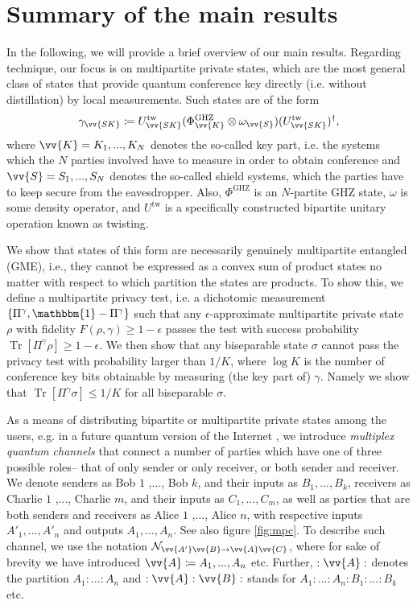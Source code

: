 \documentclass[aps,pra,twocolumn,superscriptaddress,longbibliography]{revtex4-1}
\def\Tr{\operatorname{Tr}}
\def\GHZ{\operatorname{GHZ}}
\newcommand{\mc}[1]{\mathcal{#1}}
\newcommand{\bbm}[1]{\mathbbm{#1}}
\begin{document}
\section{Summary of the main results}\label{sec:main}
In the following, we will provide a brief overview of our main results. Regarding technique, our focus is on multipartite private states, which are the most general class of states that provide quantum conference key directly (i.e. without distillation) by local measurements. Such states are of the form  \cite{AH09}
\begin{equation}
\gamma_{\vv{SK}}\coloneqq U^{\text{tw}}_{\vv{SK}} (\Phi^{\GHZ}_{\vv{K}}\otimes\omega_{\vv{S}}) (U^{\text{tw}}_{\vv{SK}})^\dag,
\end{equation}
where $\vv{K}=K_1,...,K_N$ denotes the so-called key part, i.e. the systems which the $N$ parties involved have to measure in order to obtain conference and $\vv{S}=S_1,...,S_N$ denotes the so-called shield systems, which the parties have to keep secure from the eavesdropper. Also, $\Phi^{\GHZ}$ is an $N$-partite GHZ state, $\omega$ is some density operator, and $U^{\text{tw}}$ is a specifically constructed bipartite unitary operation known as twisting. 

We show that states of this form are necessarily genuinely multipartite entangled (GME), i.e., they cannot be expressed as a convex sum of product states no matter with respect to which partition the states are products. To show this, we define a multipartite privacy test, i.e. a dichotomic measurement $\{\Pi^\gamma,\bbm{1}-\Pi^\gamma\}$ such that any $\epsilon$-approximate multipartite private state $\rho$ with fidelity $F(\rho,\gamma)\geq1-\epsilon$ passes the test with success probability $\Tr[\Pi^\gamma\rho]\geq 1-\epsilon$. We then show that any biseparable state $\sigma$ cannot pass the privacy test with probability larger than $1/K$, where $\log K$ is the number of conference key bits obtainable by measuring (the key part of) $\gamma$. Namely we show that $\Tr[\Pi^\gamma\sigma]\leq1/K$ for all biseparable $\sigma$. 


As a means of distributing bipartite or multipartite private states among the users, e.g. in a future quantum version of the Internet \cite{DM03,WEH18}, we introduce {\it multiplex quantum channels} that connect a number of parties which have one of three possible roles-- that of only sender or only receiver, or both sender and receiver. We denote senders as Bob $1$ ,..., Bob $k$, and their inputs as $B_1,...,B_k$, receivers as Charlie $1$ ,..., Charlie $m$, and their inputs as $C_1,...,C_m$, as well as parties that are both senders and receivers as Alice $1$ ,..., Alice $n$, with respective inputs $A'_1,...,A'_n$ and outputs $A_1,...,A_n$. See also figure \ref{fig:mpc}. To describe such channel, we use the notation $\mc{N}_{\vv{A'}\vv{B}\to\vv{A}\vv{C}}$, where for sake of brevity we have introduced $\vv{A}\coloneqq A_1,...,A_n$ etc. Further, $:\vv{A}:$ denotes the partition $A_1:...:A_n$ and $:\vv{A}:\vv{B}:$ stands for $A_1:...:A_n:B_1:...:B_k$  etc. 
\end{document}
